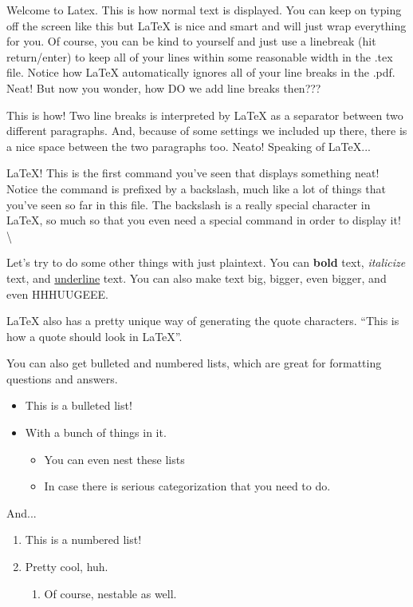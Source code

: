 \documentclass{article}
\begin{document}
\thispagestyle{firstpage}

Welcome to Latex. This is how normal text is displayed. You can keep on typing off the screen like this but LaTeX is nice and smart and will just wrap everything for you. Of course, you
can be kind to yourself and just use a linebreak (hit return/enter) to keep
all of your lines within some reasonable width in the .tex file. Notice how
LaTeX automatically ignores all of your line breaks in the .pdf. Neat! But now
you wonder, how DO we add line breaks then???

This is how! Two line breaks is interpreted by LaTeX as a separator between two
different paragraphs. And, because of some settings we included up there, there
is a nice space between the two paragraphs too. Neato! Speaking of LaTeX...

\LaTeX! This is the first command you've seen that displays something neat!
Notice the command is prefixed by a backslash, much like a lot of things that
you've seen so far in this file. The backslash is a really special character in
\LaTeX, so much so that you even need a special command in order to display
it! \textbackslash{}

Let's try to do some other things with just plaintext. You can \textbf{bold}
text, \textit{italicize} text, and \underline{underline} text. You can also
make text {\large big}, {\Large bigger}, even {\LARGE bigger}, and even
{\Huge HHHUUGEEE}.

\LaTeX{} \@ also has a pretty unique way of generating the quote characters.
``This is how a quote should look in LaTeX''.

You can also get bulleted and numbered lists, which are great for formatting
questions and answers.
\begin{itemize}
  \item This is a bulleted list!
  \item With a bunch of things in it.
  \begin{itemize}
    \item You can even nest these lists
    \item In case there is serious categorization that you need to do.
  \end{itemize}
\end{itemize}

And...

\begin{enumerate}
  \item This is a numbered list!
  \item Pretty cool, huh.
  \begin{enumerate}
    \item Of course, nestable as well.
  \end{enumerate}
\end{enumerate}
\end{document}
